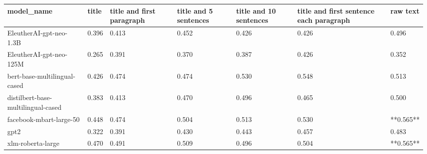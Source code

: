 \begin{tabular}{lllllll}
\toprule
                        model\_name & title & title and first paragraph & title and 5 sentences & title and 10 sentences & title and first sentence each paragraph &  raw text \\
\midrule
           EleutherAI-gpt-neo-1.3B & 0.396 &                     0.413 &                 0.452 &                  0.426 &                                   0.426 &     0.496 \\
           EleutherAI-gpt-neo-125M & 0.265 &                     0.391 &                 0.370 &                  0.387 &                                   0.426 &     0.352 \\
      bert-base-multilingual-cased & 0.426 &                     0.474 &                 0.474 &                  0.530 &                                   0.548 &     0.513 \\
distilbert-base-multilingual-cased & 0.383 &                     0.413 &                 0.470 &                  0.496 &                                   0.465 &     0.500 \\
           facebook-mbart-large-50 & 0.448 &                     0.474 &                 0.504 &                  0.513 &                                   0.530 & **0.565** \\
                              gpt2 & 0.322 &                     0.391 &                 0.430 &                  0.443 &                                   0.457 &     0.483 \\
                 xlm-roberta-large & 0.470 &                     0.491 &                 0.509 &                  0.496 &                                   0.504 & **0.565** \\
\bottomrule
\end{tabular}
